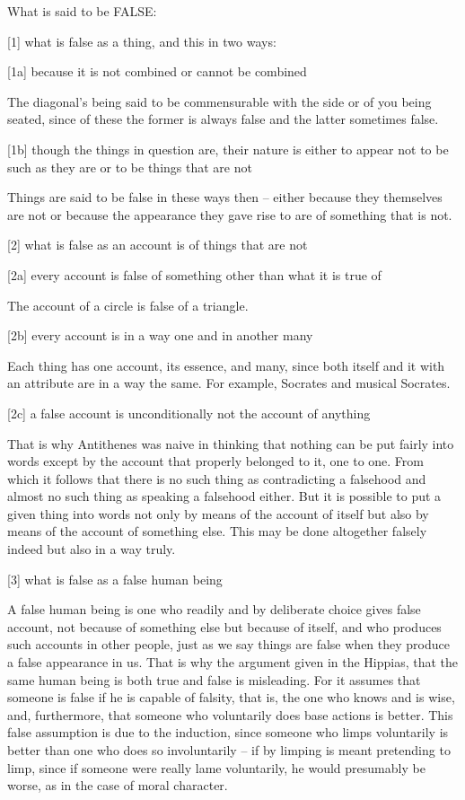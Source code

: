 
What is said to be FALSE:

[1]     what is false as a thing, and this in two ways:

[1a]    because it is not combined or cannot be combined

        The diagonal's being said to be commensurable with the side or
        of you being seated, since of these the former is always false and
        the latter sometimes false.

[1b]    though the things in question are, their nature is
        either to appear not to be such as they are or
        to be things that are not
                
        Things are said to be false in these ways then --
        either because they themselves are not or
        because the appearance they gave rise to are
        of something that is not.

[2]     what is false as an account is of things that are not

[2a]    every account is false of something other than what it is true of

        The account of a circle is false of a triangle.

[2b]    every account is in a way one and in another many

        Each thing has one account, its essence, and many, 
        since both itself and it with an attribute are in a way the same.
        For example, Socrates and musical Socrates.

[2c]    a false account is unconditionally not the account of anything

        That is why Antithenes was naive in thinking that nothing can be put
        fairly into words except by the account that properly belonged to it, one to one.
        From which it follows that there is no such thing as contradicting a falsehood
        and almost no such thing as speaking a falsehood either. 
        But it is possible to put a given thing into words
        not only by means of the account of itself
        but also by means of the account of something else.
        This may be done altogether falsely indeed but also in a way truly.

[3]     what is false as a false human being

        A false human being is one who readily and by deliberate choice
        gives false account, not because of something else but because of itself,
        and who produces such accounts in other people,
        just as we say things are false when they produce a false appearance in us.
        That is why the argument given in the Hippias, that the
        same human being is both true and false is misleading.
        For it assumes that someone is false if he is capable of falsity,
        that is, the one who knows and is wise, and, furthermore,
        that someone who voluntarily does base actions is better.
        This false assumption is due to the induction, since someone
        who limps voluntarily is better than one who does so involuntarily --
        if by limping is meant pretending to limp, since if someone were
        really lame voluntarily, he would presumably be worse, as in the
        case of moral character.

